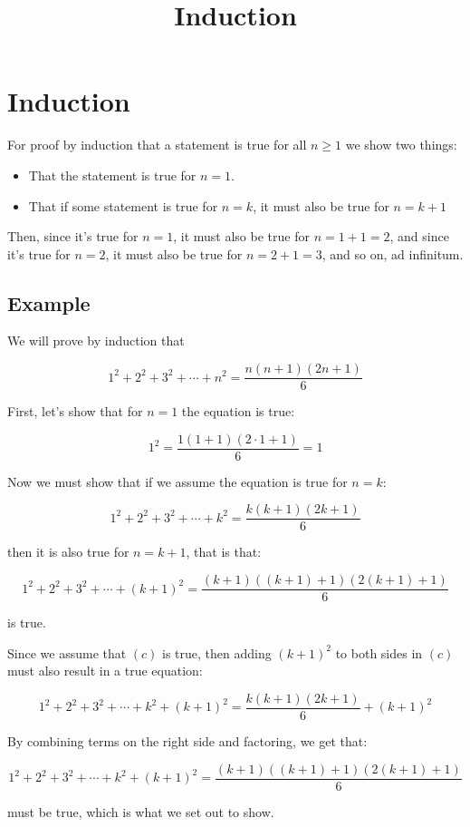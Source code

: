 \documentclass{article}
\title{Induction}
\begin{document}
\section{Induction}

For proof by induction that a statement is true for all $n \geq 1$  we show two things:

\begin{itemize}
\item That the statement is true for $n = 1$.
\item That if some statement is true for $n = k$, it must also be true for $n = k + 1$
\end{itemize}

Then, since it's true for $n = 1$, it must also be true for $n = 1 + 1 = 2$, and since it's true for $n = 2$, it must also be true for $n = 2 + 1 = 3$, and so on, ad infinitum.

\subsection{Example}

We will prove by induction that

\[ \tag{a} 1^2 + 2^2 + 3^2 + \cdots + n^2 = \frac{n(n+1)(2n+1)}{6} \]

First, let's show that for $n = 1$ the equation is true:

\[ \tag{b} 1^2 = \frac{1(1 + 1)(2 \cdot 1 + 1)}{6}  = 1 \]

Now we must show that if we assume the equation is true for $n = k$:

\[ \tag{c} 1^2 + 2^2 + 3^2 + \cdots + k^2 = \frac{k(k+1)(2k + 1)}{6} \]

then it is also true for $n = k + 1$, that is that:

\[ \tag{d} 1^2 + 2^2 + 3^2 + \cdots + (k+1)^2 = \frac{(k+1)((k+1)+1)(2(k+1) + 1)}{6} \]

is true.

Since we assume that $(c)$ is true, then adding $(k + 1)^2$ to both sides in $(c)$ must also result in a true equation:

\[ \tag{e} 1^2 + 2^2 + 3^2 + \cdots + k^2 + (k+1)^2 = \frac{k(k+1)(2k + 1)}{6} + (k + 1)^2 \]

By combining terms on the right side and factoring, we get that:

\[ \tag{e} 1^2 + 2^2 + 3^2 + \cdots + k^2 + (k+1)^2 = \frac{(k+1)((k+1)+1)(2(k+1) + 1)}{6} \]

must be true, which is what we set out to show.
\end{document}
